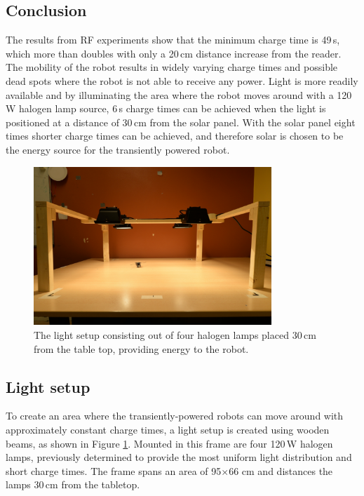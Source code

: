 \subsection{Conclusion}

The results from RF experiments show that the minimum charge time is 49\,s, which more than doubles with only a 20\,cm distance increase from the reader.
The mobility of the robot results in widely varying charge times and possible dead spots where the robot is not able to receive any power.
Light is more readily available and by illuminating the area where the robot moves around with a 120\,W halogen lamp source, 6\,s charge times can be achieved when the light is positioned at a distance of 30\,cm from the solar panel.
With the solar panel eight times shorter charge times can be achieved, and therefore solar is chosen to be the energy source for the transiently powered robot.

\begin{figure}[!ht]
	\centering
	\includegraphics[width=0.8\textwidth]{pics/light_setup.jpg}
	\caption{The light setup consisting out of four halogen lamps placed 30\,cm from the table top, providing energy to the robot.}
	\label{fig:light_setup}
\end{figure}

\subsection{Light setup}

To create an area where the transiently-powered robots can move around with approximately constant charge times, a light setup is created using wooden beams, as shown in Figure \ref{fig:light_setup}.
Mounted in this frame are four 120\,W halogen lamps, previously determined to provide the most uniform light distribution and short charge times.
The frame spans an area of 95$\times$66 cm and distances the lamps 30\,cm from the tabletop.

